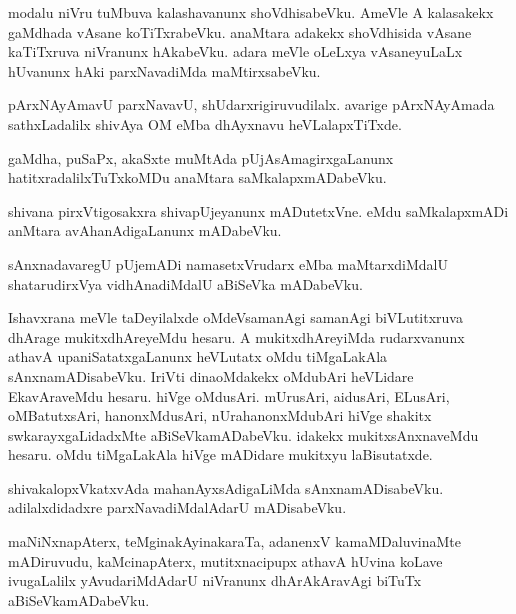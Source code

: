 \documentclass{article}
\begin{document}
\begin{mn}
modalu  niVru  tuMbuva  kalashavanunx  shoVdhisabeVku.  AmeVle  A  kalasakekx  gaMdhada  vAsane  
koTiTxrabeVku.  anaMtara  adakekx  shoVdhisida  vAsane  kaTiTxruva  niVranunx  hAkabeVku.  adara  
meVle  oLeLxya  vAsaneyuLaLx  hUvanunx  hAki  parxNavadiMda  maMtirxsabeVku.
\end{mn}

\begin{mn}
pArxNAyAmavU  parxNavavU,  shUdarxrigiruvudilalx.  avarige  pArxNAyAmada  sathxLadalilx  shivAya  
OM  eMba  dhAyxnavu  heVLalapxTiTxde.
\end{mn}

\begin{mn}
gaMdha,  puSaPx,  akaSxte  muMtAda  pUjAsAmagirxgaLanunx  hatitxradalilxTuTxkoMDu  anaMtara  saMkalapxmADabeVku.
\end{mn}

\begin{mn}
shivana  pirxVtigosakxra  shivapUjeyanunx  mADutetxVne.  eMdu  saMkalapxmADi  anMtara  avAhanAdigaLanunx  mADabeVku.
\end{mn}

\begin{mn}
sAnxnadavaregU  pUjemADi  namasetxVrudarx  eMba  maMtarxdiMdalU  shatarudirxVya  vidhAnadiMdalU  aBiSeVka  mADabeVku. 
\end{mn}

\begin{mn}
Ishavxrana  meVle  taDeyilalxde  oMdeVsamanAgi  samanAgi  biVLutitxruva  dhArage  mukitxdhAreyeMdu  
hesaru.  A  mukitxdhAreyiMda  rudarxvanunx  athavA  upaniSatatxgaLanunx  heVLutatx  oMdu  tiMgaLakAla  
sAnxnamADisabeVku.  IriVti  dinaoMdakekx  oMdubAri  heVLidare  EkavAraveMdu  hesaru.  hiVge  oMdusAri.  
mUrusAri,  aidusAri,  ELusAri,  oMBatutxsAri,  hanonxMdusAri,  nUrahanonxMdubAri  hiVge  shakitx  
swkarayxgaLidadxMte  aBiSeVkamADabeVku.  idakekx  mukitxsAnxnaveMdu  hesaru.  oMdu  tiMgaLakAla  
hiVge  mADidare  mukitxyu  laBisutatxde.
\end{mn}

\begin{mn}
shivakalopxVkatxvAda  mahanAyxsAdigaLiMda  sAnxnamADisabeVku.  adilalxdidadxre  parxNavadiMdalAdarU  mADisabeVku.
\end{mn}

\begin{mn}
maNiNxnapAterx,  teMginakAyinakaraTa,  adanenxV  kamaMDaluvinaMte  mADiruvudu,  kaMcinapAterx,  mutitxnacipupx  
athavA  hUvina  koLave  ivugaLalilx  yAvudariMdAdarU  niVranunx  dhArAkAravAgi  biTuTx  aBiSeVkamADabeVku.
\end{mn}
\end{document}
